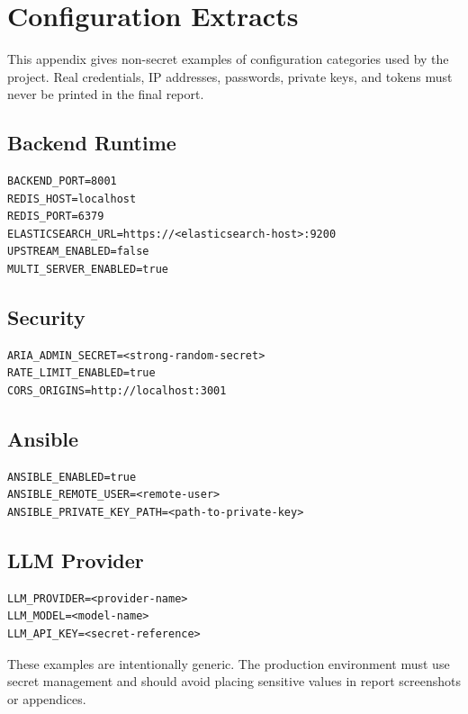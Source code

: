 \chapter{Configuration Extracts}

This appendix gives non-secret examples of configuration categories used by the project. Real credentials, IP addresses, passwords, private keys, and tokens must never be printed in the final report.

\section{Backend Runtime}

\begin{verbatim}
BACKEND_PORT=8001
REDIS_HOST=localhost
REDIS_PORT=6379
ELASTICSEARCH_URL=https://<elasticsearch-host>:9200
UPSTREAM_ENABLED=false
MULTI_SERVER_ENABLED=true
\end{verbatim}

\section{Security}

\begin{verbatim}
ARIA_ADMIN_SECRET=<strong-random-secret>
RATE_LIMIT_ENABLED=true
CORS_ORIGINS=http://localhost:3001
\end{verbatim}

\section{Ansible}

\begin{verbatim}
ANSIBLE_ENABLED=true
ANSIBLE_REMOTE_USER=<remote-user>
ANSIBLE_PRIVATE_KEY_PATH=<path-to-private-key>
\end{verbatim}

\section{LLM Provider}

\begin{verbatim}
LLM_PROVIDER=<provider-name>
LLM_MODEL=<model-name>
LLM_API_KEY=<secret-reference>
\end{verbatim}

These examples are intentionally generic. The production environment must use secret management and should avoid placing sensitive values in report screenshots or appendices.

